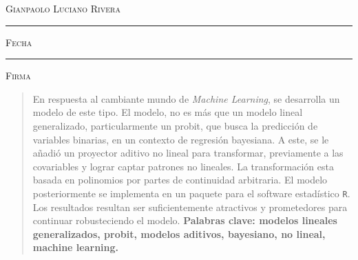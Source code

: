 \documentclass[../Main/Main.tex]{subfiles}
\begin{document}
\centering

\hspace{3em}

\textsc{Gianpaolo Luciano Rivera}

\vspace{5em}

\rule[1em]{20em}{0.5pt} %

\textsc{Fecha}
 
\vspace{8em}

\rule[1em]{20em}{0.5pt} %

\textsc{Firma}

\endgroup
\vspace*{\fill}

\begin{abstract}
	\begin{singlespace}
	En respuesta al cambiante mundo de \textit{Machine Learning}, se desarrolla un modelo de este tipo. El modelo, no es más que un modelo lineal generalizado, particularmente un probit, que busca la predicción de variables binarias, en un contexto de regresión bayesiana. A este, se le añadió un proyector aditivo no lineal para transformar, previamente a las covariables y lograr captar patrones no lineales. La transformación esta basada en polinomios por partes de continuidad arbitraria. El modelo posteriormente se implementa en un paquete para el software estadístico \verb|R|. Los resultados resultan ser suficientemente atractivos y prometedores para continuar robusteciendo el modelo. 
	\noindent \textbf{Palabras clave: modelos lineales generalizados, probit, modelos aditivos, bayesiano, no lineal, machine learning.}
	\end{singlespace}
\end{abstract}
\clearpage
\end{document}
